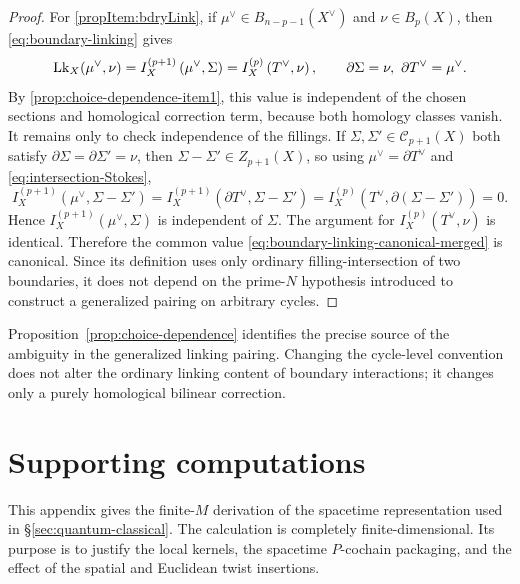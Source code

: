 \begin{proof}
	For \ref{propItem:bdryLink}, if
	\(\mu^\vee\in B_{n-p-1}(X^\vee)\) and \(\nu\in B_p(X)\), then
	\eqref{eq:boundary-linking} gives
	\begin{equation}
		\mathrm{Lk}_X(\mu^\vee,\nu)
		=
		I_X^{(p+1)}\left(\mu^\vee,\Sigma\right)
		=
		I_X^{(p)}\left(T^\vee,\nu\right),
		\qquad
		\partial\Sigma=\nu,\ \partial T^\vee=\mu^\vee.
	\end{equation}
	By \ref{prop:choice-dependence-item1}, this value is independent of the chosen
	sections and homological correction term, because both homology classes vanish.
	It remains only to check independence of the fillings. If
	\(\Sigma,\Sigma'\in\mathcal C_{p+1}(X)\) both satisfy
	\(\partial\Sigma=\partial\Sigma'=\nu\), then \(\Sigma-\Sigma'\in Z_{p+1}(X)\), so
	using \(\mu^\vee=\partial T^\vee\) and \eqref{eq:intersection-Stokes},
	\begin{equation}
		I_X^{(p+1)}\left(\mu^\vee,\Sigma-\Sigma'\right)
		=
		I_X^{(p+1)}\left(\partial T^\vee,\Sigma-\Sigma'\right)
		=
		I_X^{(p)}\left(T^\vee,\partial(\Sigma-\Sigma')\right)
		=
		0.
	\end{equation}
	Hence \(I_X^{(p+1)}(\mu^\vee,\Sigma)\) is independent of \(\Sigma\). The argument for
	\(I_X^{(p)}(T^\vee,\nu)\) is identical. Therefore the common value
	\eqref{eq:boundary-linking-canonical-merged} is canonical. Since its definition uses
	only ordinary filling-intersection of two boundaries, it does not depend on the
	prime-\(N\) hypothesis introduced to construct a generalized pairing on arbitrary
	cycles.
\end{proof}

Proposition~\ref{prop:choice-dependence} identifies the precise source of the ambiguity in
the generalized linking pairing. Changing the cycle-level convention does not alter the
ordinary linking content of boundary interactions; it changes only a purely homological
bilinear correction.







\section{Supporting computations}
\label{app:computeTr}

This appendix gives the finite-\(M\) derivation of the spacetime representation used in
\S\ref{sec:quantum-classical}.  The calculation is completely finite-dimensional.
Its purpose is to justify the local kernels, the spacetime \(P\)-cochain packaging, and the
effect of the spatial and Euclidean twist insertions.

